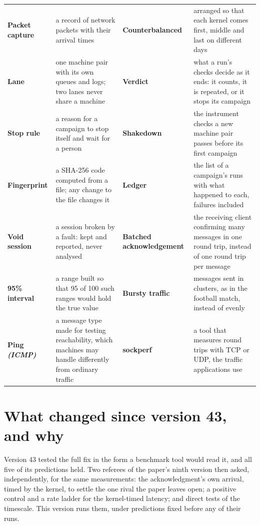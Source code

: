 \documentclass[11pt]{article}
\newcommand{\gl}[1]{{\color{soft}\itshape\small (#1)}}
\begin{document}
{\begin{tabularx}{\linewidth}{@{}>{\bfseries}p{3.1cm} X >{\bfseries}p{3.1cm} X@{}}
Packet capture & a record of network packets with their arrival times & Counterbalanced & arranged so that each kernel comes first, middle and last on different days \\
Lane & one machine pair with its own queues and logs; two lanes never share a machine & Verdict & what a run's checks decide as it ends: it counts, it is repeated, or it stops its campaign \\
Stop rule & a reason for a campaign to stop itself and wait for a person & Shakedown & the instrument checks a new machine pair passes before its first campaign \\
Fingerprint & a SHA-256 code computed from a file; any change to the file changes it & Ledger & the list of a campaign's runs with what happened to each, failures included \\
Void session & a session broken by a fault: kept and reported, never analysed & Batched acknowledgement & the receiving client confirming many messages in one round trip, instead of one round trip per message \\
95\% interval & a range built so that 95 of 100 such ranges would hold the true value & Bursty traffic & messages sent in clusters, as in the football match, instead of evenly \\
Ping \gl{ICMP} & a message type made for testing reachability, which machines may handle differently from ordinary traffic & sockperf & a tool that measures round trips with TCP or UDP, the traffic applications use \\
\end{tabularx}}

\section*{What changed since version 43, and why}
Version 43 tested the full fix in the form a benchmark tool would read it, and all five of its
predictions held. Two referees of the paper's ninth version then asked, independently, for the
same measurements: the acknowledgment's own arrival, timed by the kernel, to settle the one rival
the paper leaves open; a positive control and a rate ladder for the kernel-timed latency; and
direct tests of the timescale. This version runs them, under predictions fixed before any of
their runs.
\end{document}
